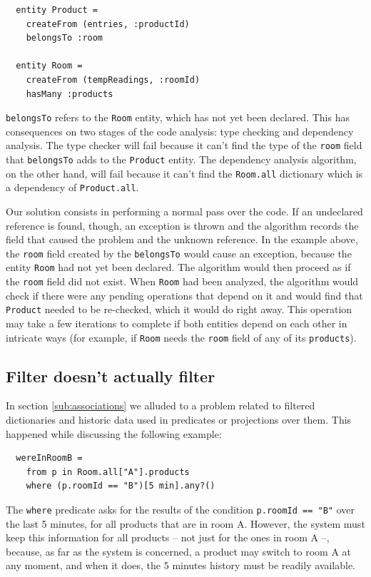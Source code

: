 \begin{lstlisting}
  entity Product =
    createFrom (entries, :productId)
    belongsTo :room

  entity Room =
    createFrom (tempReadings, :roomId)
    hasMany :products
\end{lstlisting}

\verb=belongsTo= refers to the \verb=Room= entity, which has not yet
been declared. This has consequences on two stages of the code
analysis: type checking and dependency analysis. The type checker will
fail because it can't find the type of the \verb=room= field that
\verb=belongsTo= adds to the \verb=Product= entity. The dependency
analysis algorithm, on the other hand, will fail because it can't find
the \verb=Room.all= dictionary which is a dependency of
\verb=Product.all=.

Our solution consists in performing a normal pass over the code. If an
undeclared reference is found, though, an exception is thrown and the
algorithm records the field that caused the problem and the unknown
reference. In the example above, the \verb=room= field created by the
\verb=belongsTo= would cause an exception, because the entity
\verb=Room= had not yet been declared. The algorithm would then
proceed as if the \verb=room= field did not exist. When \verb=Room=
had been analyzed, the algorithm would check if there were any pending
operations that depend on it and would find that \verb=Product= needed
to be re-checked, which it would do right away. This operation may
take a few iterations to complete if both entities depend on each
other in intricate ways (for example, if \verb=Room= needs the
\verb=room= field of any of its \verb=products=).

\subsection{Filter doesn't actually filter}

In section \ref{sub:associations} we alluded to a problem related to
filtered dictionaries and historic data used in predicates or
projections over them. This happened while discussing the following
example:

\begin{lstlisting}
  wereInRoomB =
    from p in Room.all["A"].products
    where (p.roomId == "B")[5 min].any?()
\end{lstlisting}

The \verb=where= predicate asks for the results of the condition
\verb!p.roomId == "B"! over the last 5 minutes, for all products that
are in room A. However, the system must keep this information for all
products -- not just for the ones in room A --, because, as far as the
system is concerned, a product may switch to room A at any moment, and
when it does, the 5 minutes history must be readily available.

